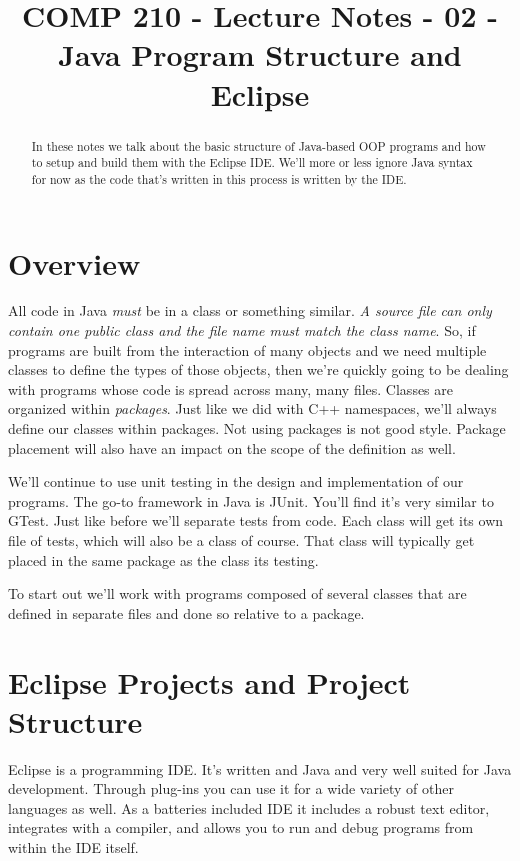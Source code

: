 \documentclass[]{tufte-handout}
\title{COMP 210 - Lecture Notes - 02 - Java Program Structure and Eclipse}
\begin{document}
\maketitle

\begin{abstract}
In these notes we talk about the basic structure of Java-based OOP programs and how to setup and build them with the Eclipse IDE. We'll more or less ignore Java syntax for now as the code that's written in this process is written by the IDE. 
\end{abstract}

\section{Overview}

All code in Java \textit{must} be in a class or something similar. \textit{A source file can only contain one public class and the file name must match the class name}. So, if programs are built from the interaction of many objects and we need multiple classes to define the types of those objects, then we're quickly going to be dealing with programs whose code is spread across many, many files. Classes are organized within \textit{packages}. Just like we did with C++ namespaces, we'll always define our classes within packages. Not using packages is not good style. Package placement will also have an impact on the scope of the definition as well. 

We'll continue to use unit testing in the design and implementation of our programs.  The go-to framework in Java is JUnit. You'll find it's very similar to GTest. Just like before we'll separate tests from code. Each class will get its own file of tests, which will also be a class of course. That class will typically get placed in the same package as the class its testing.

To start out we'll work with programs composed of several classes that are defined in separate files and done so relative to a package. 


\section{Eclipse Projects and Project Structure}

Eclipse is a programming IDE. It's written and Java and very well suited for Java development. Through plug-ins you can use it for a wide variety of other languages as well. As a batteries included IDE it includes a robust text editor, integrates with a compiler, and allows you to run and debug programs from within the IDE itself. 
\end{document}
